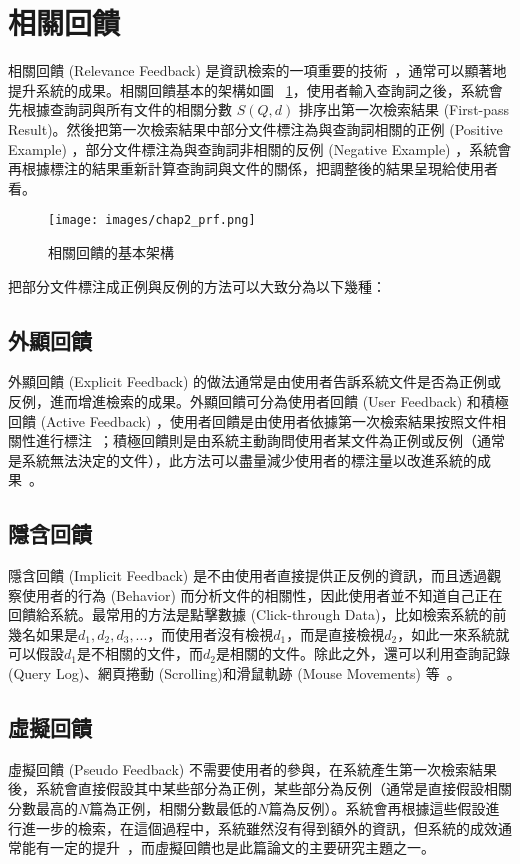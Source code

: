 \section{相關回饋}
相關回饋 (Relevance Feedback) 是資訊檢索的一項重要的技術~\cite{ruthven2003survey}，通常可以顯著地提升系統的成果。相關回饋基本的架構如圖 ~\ref{fig:chap2_prf}，使用者輸入查詢詞之後，系統會先根據查詢詞與所有文件的相關分數 $S(Q, d)$ 排序出第一次檢索結果 (First-pass Result)。然後把第一次檢索結果中部分文件標注為與查詢詞相關的正例 (Positive Example) ，部分文件標注為與查詢詞非相關的反例 (Negative Example)
，系統會再根據標注的結果重新計算查詢詞與文件的關係，把調整後的結果呈現給使用者看。
\begin{figure}
\centering
\texttt{[image: images/chap2\_prf.png]}
\caption{相關回饋的基本架構} \label{fig:chap2_prf}
\end{figure}


把部分文件標注成正例與反例的方法可以大致分為以下幾種：

\subsection{外顯回饋}
外顯回饋 (Explicit Feedback) 的做法通常是由使用者告訴系統文件是否為正例或反例，進而增進檢索的成果。外顯回饋可分為使用者回饋 (User Feedback) 和積極回饋 (Active Feedback)
，使用者回饋是由使用者依據第一次檢索結果按照文件相關性進行標注~\cite{salton1975vector, zhai2001model, robertson1976relevance}；積極回饋則是由系統主動詢問使用者某文件為正例或反例（通常是系統無法決定的文件），此方法可以盡量減少使用者的標注量以改進系統的成果~\cite{tong2001support, goh2004multimodal, he2004mean}。

\subsection{隱含回饋}
隱含回饋 (Implicit Feedback) 是不由使用者直接提供正反例的資訊，而且透過觀察使用者的行為 (Behavior) 而分析文件的相關性，因此使用者並不知道自己正在回饋給系統。最常用的方法是點擊數據 (Click-through Data)，比如檢索系統的前幾名如果是$d_1, d_2, d_3, ...$，而使用者沒有檢視$d_1$，而是直接檢視$d_2$，如此一來系統就可以假設$d_1$是不相關的文件，而$d_2$是相關的文件。除此之外，還可以利用查詢記錄 (Query Log)、網頁捲動
(Scrolling)和滑鼠軌跡 (Mouse Movements) 等~\cite{kelly2003implicit}。

\subsection{虛擬回饋}
\label{sec:pseudo_feedback}
虛擬回饋 (Pseudo Feedback) 不需要使用者的參與，在系統產生第一次檢索結果後，系統會直接假設其中某些部分為正例，某些部分為反例（通常是直接假設相關分數最高的$N$篇為正例，相關分數最低的$N$篇為反例）。系統會再根據這些假設進行進一步的檢索，在這個過程中，系統雖然沒有得到額外的資訊，但系統的成效通常能有一定的提升~\cite{kurland2005better, xu1996query, yu2003improving, sakai2005flexible, cao2008selecting, lee2008cluster, lv2009comparative, lv2010positional}，而虛擬回饋也是此篇論文的主要研究主題之一。

